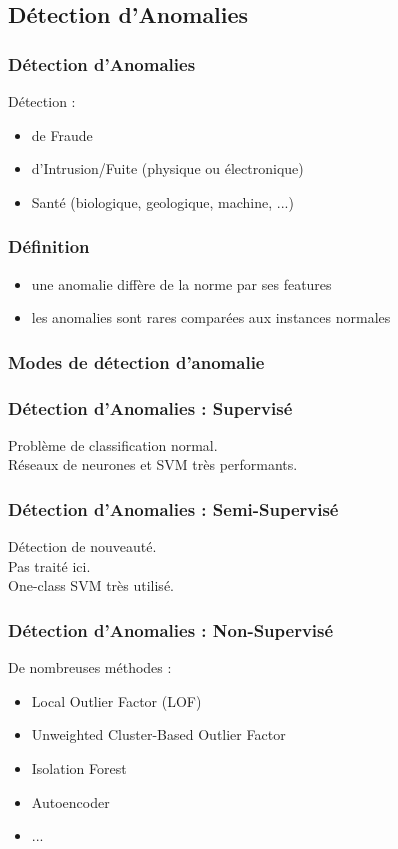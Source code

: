 \subsection{Détection d'Anomalies}

\begin{frame}
  \frametitle{Détection d'Anomalies}
  Détection :
  \begin{itemize}
  \item de Fraude
  \item d'Intrusion/Fuite (physique ou électronique)
  \item Santé (biologique, geologique, machine, ...)
  \end{itemize}
\end{frame}

\begin{frame}
  \frametitle{Définition}
  \begin{itemize}
  \item une anomalie diffère de la norme par ses features
  \item les anomalies sont rares comparées aux instances normales
  \end{itemize}
\end{frame}

\begin{frame}
  \frametitle{Modes de détection d'anomalie}
\end{frame}

\begin{frame}
  \frametitle{Détection d'Anomalies : Supervisé}
  Problème de classification normal. \\
  Réseaux de neurones et SVM très performants.
\end{frame}

\begin{frame}
  \frametitle{Détection d'Anomalies : Semi-Supervisé}
  Détection de nouveauté. \\
  Pas traité ici. \\
  One-class SVM très utilisé.
\end{frame}

\begin{frame}
  \frametitle{Détection d'Anomalies : Non-Supervisé}
  De nombreuses méthodes : 
  \begin{itemize}
  \item Local Outlier Factor (LOF)
  \item Unweighted Cluster-Based Outlier Factor
  \item Isolation Forest
  \item Autoencoder
  \item ...
  \end{itemize}
\end{frame}

